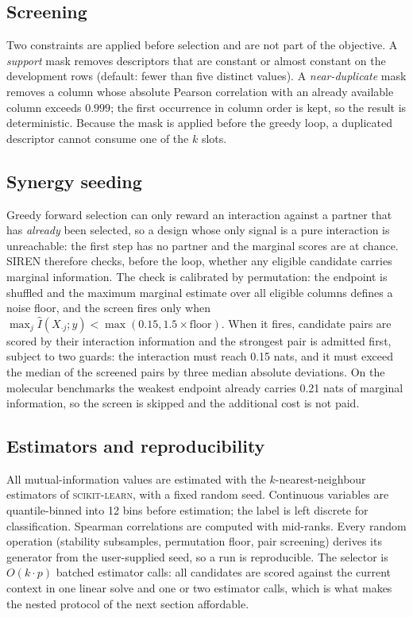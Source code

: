\subsection{Screening}

Two constraints are applied before selection and are not part of the objective.
A \emph{support} mask removes descriptors that are constant or almost constant
on the development rows (default: fewer than five distinct values). A
\emph{near-duplicate} mask removes a column whose absolute Pearson correlation
with an already available column exceeds $0.999$; the first occurrence in column
order is kept, so the result is deterministic. Because the mask is applied before
the greedy loop, a duplicated descriptor cannot consume one of the $k$ slots.

\subsection{Synergy seeding}

Greedy forward selection can only reward an interaction against a partner that
has \emph{already} been selected, so a design whose only signal is a pure
interaction is unreachable: the first step has no partner and the marginal
scores are at chance. SIREN therefore checks, before the loop, whether any
eligible candidate carries marginal information. The check is calibrated by
permutation: the endpoint is shuffled and the maximum marginal estimate over all
eligible columns defines a noise floor, and the screen fires only when
$\max_j \hat{I}(X_{\cdot j}; y) < \max(0.15, 1.5 \times \text{floor})$.
When it fires, candidate pairs are scored by their interaction information and
the strongest pair is admitted first, subject to two guards: the interaction must
reach 0.15 nats, and it must exceed the median of the screened pairs by three
median absolute deviations. On the molecular benchmarks the weakest endpoint
already carries 0.21 nats of marginal information, so the screen is skipped and
the additional cost is not paid.

\subsection{Estimators and reproducibility}

All mutual-information values are estimated with the $k$-nearest-neighbour
estimators of \textsc{scikit-learn}, with a fixed random seed. Continuous
variables are quantile-binned into 12 bins before estimation; the label is left
discrete for classification. Spearman correlations are computed with mid-ranks.
Every random operation (stability subsamples, permutation floor, pair screening)
derives its generator from the user-supplied seed, so a run is reproducible. The
selector is $O(k \cdot p)$ batched estimator calls: all candidates are scored
against the current context in one linear solve and one or two estimator calls,
which is what makes the nested protocol of the next section affordable.

